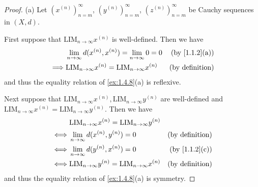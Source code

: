 \begin{proof}{(a)}
  Let \((x^{(n)})_{n = m}^\infty\), \((y^{(n)})_{n = m}^\infty\), \((z^{(n)})_{n = m}^\infty\) be Cauchy sequences in \((X, d)\).

  First suppose that \(\text{LIM}_{n \to \infty} x^{(n)}\) is well-defined.
  Then we have
  \begin{align*}
             & \lim_{n \to \infty} d(x^{(n)}, x^{(n)}) = \lim_{n \to \infty} 0 = 0   & \text{(by \cref{1.1.2}(a))} \\
    \implies & \text{LIM}_{n \to \infty} x^{(n)} = \text{LIM}_{n \to \infty} x^{(n)} & \text{(by definition)}
  \end{align*}
  and thus the equality relation of \cref{ex:1.4.8}(a) is reflexive.

  Next suppose that \(\text{LIM}_{n \to \infty} x^{(n)}, \text{LIM}_{n \to \infty} y^{(n)}\) are well-defined and \(\text{LIM}_{n \to \infty} x^{(n)} = \text{LIM}_{n \to \infty} y^{(n)}\).
  Then we have
  \begin{align*}
         & \text{LIM}_{n \to \infty} x^{(n)} = \text{LIM}_{n \to \infty} y^{(n)}                               \\
    \iff & \lim_{n \to \infty} d(x^{(n)}, y^{(n)}) = 0                           & \text{(by definition)}      \\
    \iff & \lim_{n \to \infty} d(y^{(n)}, x^{(n)}) = 0                           & \text{(by \cref{1.1.2}(c))} \\
    \iff & \text{LIM}_{n \to \infty} y^{(n)} = \text{LIM}_{n \to \infty} x^{(n)} & \text{(by definition)}
  \end{align*}
  and thus the equality relation of \cref{ex:1.4.8}(a) is symmetry.


\end{proof}
